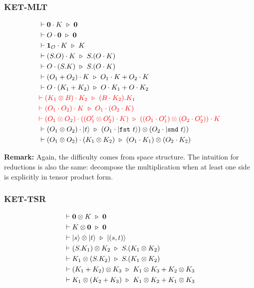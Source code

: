 \subsubsection*{\textsf{KET-MLT}}
\begin{align*}
  & \vdash \textbf{0} \cdot K \ \triangleright\  \textbf{0} \\
  & \vdash O \cdot \mathbf{0} \ \triangleright\  \mathbf{0} \\
  & \vdash \textbf{1}_\mathcal{O} \cdot K \ \triangleright\  K \\
  & \vdash (S.O) \cdot K \ \triangleright\  S.(O \cdot K) \\
  & \vdash O \cdot (S.K) \ \triangleright\  S.(O \cdot K) \\
  & \vdash (O_1 + O_2) \cdot K \ \triangleright\  O_1 \cdot K + O_2 \cdot K \\
  & \vdash O \cdot (K_1 + K_2) \ \triangleright\  O \cdot K_1 + O \cdot K_2 \\
  & \textcolor{red}{\vdash (K_1 \otimes B) \cdot K_2 \ \triangleright\  (B \cdot K_2).K_1} \\
  & \textcolor{red}{\vdash (O_1 \cdot O_2) \cdot K \ \triangleright\  O_1 \cdot (O_2 \cdot K)} \\
  & \textcolor{red}{\vdash (O_1 \otimes O_2) \cdot ((O_1' \otimes O_2') \cdot K) \ \triangleright\  ((O_1 \cdot O_1') \otimes (O_2 \cdot O_2')) \cdot K} \\
  & \vdash (O_1 \otimes O_2) \cdot |t\rangle \ \triangleright\  (O_1 \cdot |\texttt{fst}\ t\rangle) \otimes (O_2 \cdot |\texttt{snd}\ t\rangle) \\
  & \vdash (O_1 \otimes O_2) \cdot (K_1 \otimes K_2) \ \triangleright\  (O_1 \cdot K_1) \otimes (O_2 \cdot K_2)
\end{align*}

\textbf{Remark: } Again, the difficulty comes from space structure. The intuition for reductions is also the same: decompose the multiplication when at least one side is explicitly in tensor product form.


\subsubsection*{\textsf{KET-TSR}}
\begin{align*}
  & \vdash \mathbf{0} \otimes K \ \triangleright\  \mathbf{0} \\
  & \vdash K \otimes \mathbf{0} \ \triangleright\  \mathbf{0} \\
  & \vdash |s\rangle \otimes |t\rangle\ \triangleright\ |(s, t)\rangle \\
  & \vdash (S.K_1) \otimes K_2 \ \triangleright\  S.(K_1 \otimes K_2) \\
  & \vdash K_1 \otimes (S.K_2) \ \triangleright\  S.(K_1 \otimes K_2) \\
  & \vdash (K_1 + K_2) \otimes K_3 \ \triangleright\  K_1 \otimes K_3 + K_2 \otimes K_3 \\
  & \vdash K_1 \otimes (K_2 + K_3) \ \triangleright\  K_1 \otimes K_2 + K_1 \otimes K_3
\end{align*}

